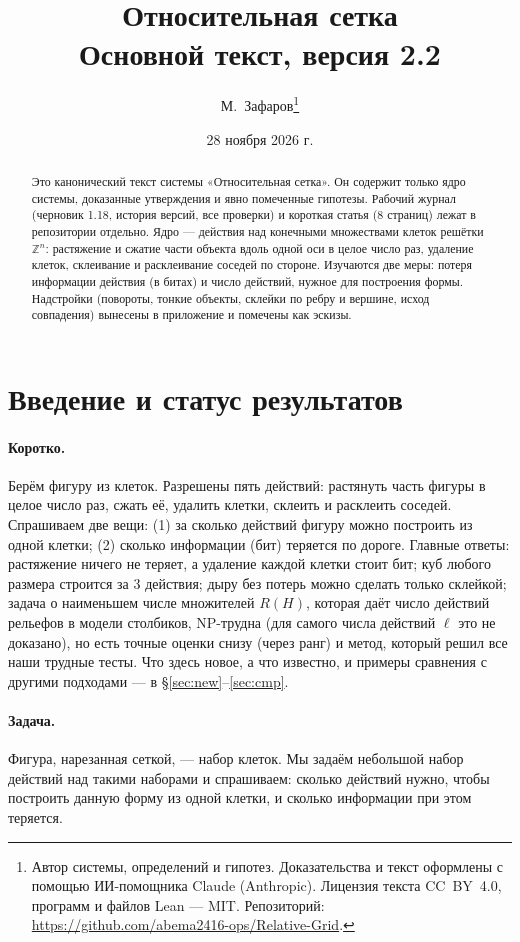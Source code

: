 \documentclass[11pt,a4paper]{article}
\title{\textbf{Относительная сетка}\\[4pt] \large Основной текст, версия 2.2}
\author{М.~Зафаров\thanks{Автор системы, определений и гипотез. Доказательства и текст оформлены с помощью ИИ-помощника Claude (Anthropic). Лицензия текста CC~BY~4.0, программ и файлов Lean — MIT. Репозиторий: \url{https://github.com/abema2416-ops/Relative-Grid}.}}
\date{28 ноября 2026 г.}
\theoremstyle{plain}
\theoremstyle{definition}
\theoremstyle{remark}
\newcommand{\Z}{\mathbb{Z}}
\begin{document}
\sloppy
\maketitle

\begin{abstract}
Это канонический текст системы «Относительная сетка». Он содержит только ядро системы, доказанные утверждения и явно помеченные гипотезы. Рабочий журнал (черновик 1.18, история версий, все проверки) и короткая статья (8 страниц) лежат в репозитории отдельно. Ядро — действия над конечными множествами клеток решётки $\Z^n$: растяжение и сжатие части объекта вдоль одной оси в целое число раз, удаление клеток, склеивание и расклеивание соседей по стороне. Изучаются две меры: потеря информации действия (в битах) и число действий, нужное для построения формы. Надстройки (повороты, тонкие объекты, склейки по ребру и вершине, исход совпадения) вынесены в приложение и помечены как эскизы.
\end{abstract}

\tableofcontents

\section{Введение и статус результатов}

\paragraph{Коротко.} Берём фигуру из клеток. Разрешены пять действий: растянуть часть фигуры в целое число раз, сжать её, удалить клетки, склеить и расклеить соседей. Спрашиваем две вещи: (1) за сколько действий фигуру можно построить из одной клетки; (2) сколько информации (бит) теряется по дороге. Главные ответы: растяжение ничего не теряет, а удаление каждой клетки стоит бит; куб любого размера строится за 3 действия; дыру без потерь можно сделать только склейкой; задача о наименьшем числе множителей $R(H)$, которая даёт число действий рельефов в модели столбиков, NP-трудна (для самого числа действий $\ell$ это не доказано), но есть точные оценки снизу (через ранг) и метод, который решил все наши трудные тесты. Что здесь новое, а что известно, и примеры сравнения с другими подходами — в §\ref{sec:new}--\ref{sec:cmp}.

\paragraph{Задача.} Фигура, нарезанная сеткой, — набор клеток. Мы задаём небольшой набор действий над такими наборами и спрашиваем: сколько действий нужно, чтобы построить данную форму из одной клетки, и сколько информации при этом теряется.
\end{document}
